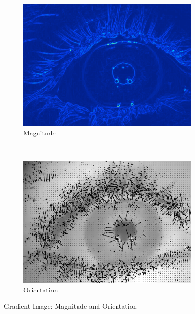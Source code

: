 \begin{figure}[h!]
	\centering
	
	\begin{subfigure}[b]{0.5\textwidth}
		\centering
		\includegraphics[width=\textwidth]{Handin1/images/magnitude.png}
		\caption{Magnitude}
		\label{subfig:magnitude}
	\end{subfigure}%
	~
	\begin{subfigure}[b]{0.5\textwidth}
		\centering
		\includegraphics[width=\textwidth]{Handin1/images/quiver.png}
		\caption{Orientation}
		\label{subfig:quiver}
	\end{subfigure}
	
	\caption{Gradient Image: Magnitude and Orientation}
\end{figure}

